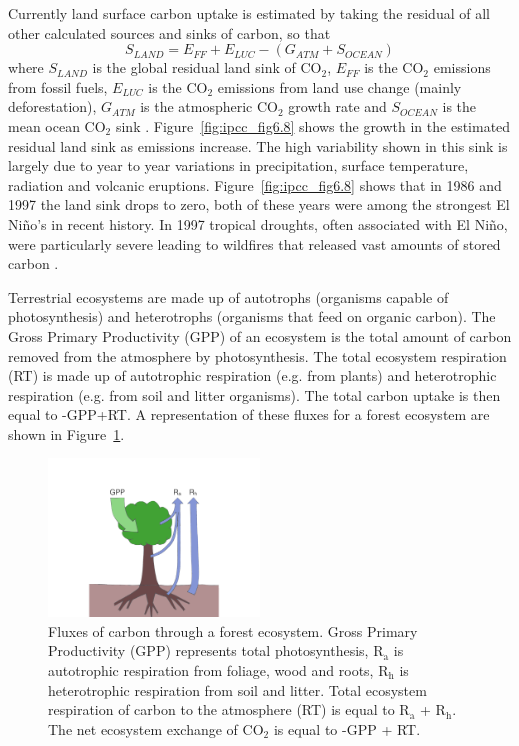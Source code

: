 \documentclass[12pt]{article}
\begin{document}
Currently land surface carbon uptake is estimated by taking the residual of all other calculated sources and sinks of carbon, so that
\begin{equation}
S_{LAND} = E_{FF} + E_{LUC} - (G_{ATM} + S_{OCEAN})
\end{equation}  
where \(S_{LAND}\) is the global residual land sink of CO\(_{2}\), \(E_{FF}\) is the CO\(_{2}\) emissions from fossil fuels, \(E_{LUC}\) is the CO\(_{2}\) emissions from land use change (mainly deforestation), \(G_{ATM}\) is the atmospheric CO\(_{2}\) growth rate and \(S_{OCEAN}\) is the mean ocean CO\(_{2}\) sink \citep{le2015global}. Figure~\ref{fig:ipcc_fig6.8} shows the growth in the estimated residual land sink as emissions increase. The high variability shown in this sink is largely due to year to year variations in precipitation, surface temperature, radiation and volcanic eruptions. Figure~\ref{fig:ipcc_fig6.8} shows that in 1986 and 1997 the land sink drops to zero, both of these years were among the strongest El Ni\~no's in recent history. In 1997 tropical droughts, often associated with El Ni\~no, were particularly severe leading to wildfires that released vast amounts of stored carbon \citep{schimel2013climate}.

Terrestrial ecosystems are made up of autotrophs (organisms capable of photosynthesis) and heterotrophs (organisms that feed on organic carbon). The Gross Primary Productivity (GPP) of an ecosystem is the total amount of carbon removed from the atmosphere by photosynthesis. The total ecosystem respiration (RT) is made up of autotrophic respiration (e.g. from plants) and heterotrophic respiration (e.g. from soil and litter organisms). The total carbon uptake is then equal to -GPP+RT. A representation of these fluxes for a forest ecosystem are shown in Figure~\ref{fig:eco_fluxes}. 

\begin{figure}[ht]
    \centering
    \includegraphics[width=0.5\textwidth]{flux.pdf}
    \caption{Fluxes of carbon through a forest ecosystem. Gross Primary Productivity (GPP) represents total photosynthesis, R\(_{\text{a}}\) is autotrophic respiration from foliage, wood and roots, R\(_{\text{h}}\) is heterotrophic respiration from soil and litter. Total ecosystem respiration of carbon to the atmosphere (RT) is equal to R\(_{\text{a}}\) + R\(_{\text{h}}\). The net ecosystem exchange of CO\(_{2}\) is equal to -GPP + RT.}
    \label{fig:eco_fluxes}
\end{figure}
\end{document}
